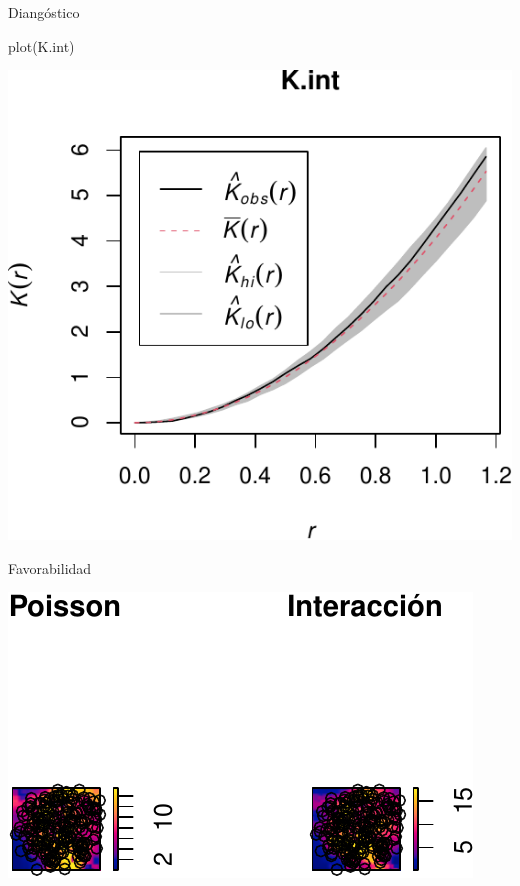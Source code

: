 \documentclass[
  11pt,
  ignorenonframetext,
]{beamer}
\newenvironment{Shaded}{}{}
\newcommand{\FunctionTok}[1]{\textcolor[rgb]{0.02,0.16,0.49}{#1}}
\newcommand{\NormalTok}[1]{#1}
\begin{document}
\begin{frame}[fragile]{Diangóstico}
\protect\hypertarget{dianguxf3stico-1}{}
\begin{Shaded}
\begin{Highlighting}[]
\FunctionTok{plot}\NormalTok{(K.int)}
\end{Highlighting}
\end{Shaded}

\begin{center}\includegraphics{Tutorial-spatstat-2_files/figure-beamer/unnamed-chunk-33-1} \end{center}
\end{frame}

\begin{frame}{Favorabilidad}
\protect\hypertarget{favorabilidad}{}
\begin{center}\includegraphics{Tutorial-spatstat-2_files/figure-beamer/unnamed-chunk-34-1} \end{center}
\end{frame}
\end{document}
